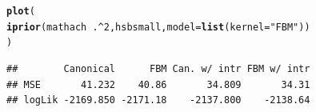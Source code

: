 \documentclass{beamer}\usepackage[]{graphicx}\usepackage[]{color}
\makeatletter
\newcommand{\hlnum}[1]{\textcolor[rgb]{0.686,0.059,0.569}{#1}}%
\newcommand{\hlstr}[1]{\textcolor[rgb]{0.192,0.494,0.8}{#1}}%
\newcommand{\hlopt}[1]{\textcolor[rgb]{0,0,0}{#1}}%
\newcommand{\hlstd}[1]{\textcolor[rgb]{0.345,0.345,0.345}{#1}}%
\newcommand{\hlkwc}[1]{\textcolor[rgb]{0.333,0.667,0.333}{#1}}%
\newcommand{\hlkwd}[1]{\textcolor[rgb]{0.737,0.353,0.396}{\textbf{#1}}}%
\newenvironment{kframe}{%
 \def\at@end@of@kframe{}%
 \ifinner\ifhmode%
  \def\at@end@of@kframe{\end{minipage}}%
  \begin{minipage}{\columnwidth}%
 \fi\fi%
 \def\FrameCommand##1{\hskip\@totalleftmargin \hskip-\fboxsep
 \colorbox{shadecolor}{##1}\hskip-\fboxsep
     \hskip-\linewidth \hskip-\@totalleftmargin \hskip\columnwidth}%
 \MakeFramed {\advance\hsize-\width
   \@totalleftmargin\z@ \linewidth\hsize
   \@setminipage}}%
 {\par\unskip\endMakeFramed%
 \at@end@of@kframe}
\newenvironment{knitrout}{}{} %
\makeatother
\begin{document}
\newsavebox{\ipriordemog}
\begin{lrbox}{\ipriordemog}
\begin{knitrout}\small
{}\color{fgcolor}\begin{kframe}
\begin{alltt}
\hlkwd{plot}\hlstd{(}
  \hlkwd{iprior}\hlstd{(mathach} \hlopt{~} \hlstd{.} \hlopt{^} \hlnum{2}\hlstd{, hsbsmall,} \hlkwc{model} \hlstd{=} \hlkwd{list}\hlstd{(}\hlkwc{kernel} \hlstd{=} \hlstr{"FBM"}\hlstd{))}
\hlstd{)}
\end{alltt}
\end{kframe}
\end{knitrout}
\end{lrbox}



\newsavebox{\ipriordemoh}
\begin{lrbox}{\ipriordemoh}
\begin{knitrout}\small
{}\color{fgcolor}\begin{kframe}
\begin{verbatim}
##        Canonical      FBM Can. w/ intr FBM w/ intr
## MSE       41.232    40.86       34.809       34.31
## logLik -2169.850 -2171.18    -2137.800    -2138.64
\end{verbatim}
\end{kframe}
\end{knitrout}
\end{lrbox}
\end{document}

